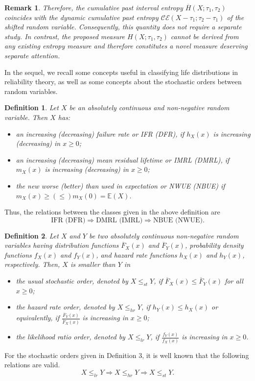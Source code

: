\documentclass[11pt]{article}
\newtheorem{remark}{Remark}
\newtheorem{definition}{Definition}
\begin{document}
\begin{remark}
	Therefore, the cumulative past interval entropy $\overline{H}(X;\tau_1,\tau_2)$ coincides with the dynamic cumulative past entropy $\mathscr{CE}(X - \tau_1; \tau_2 - \tau_1)$ of the shifted random variable. Consequently, this quantity does not require a separate study. In contrast, the proposed measure $ H(X; \tau_1, \tau_2) $ cannot be derived from any existing entropy measure and therefore constitutes a novel measure deserving separate attention.
\end{remark}

In the sequel, we recall some concepts useful in classifying life distributions in reliability theory, as well as some concepts about the stochastic orders between random variables.

\begin{definition}
	Let $X$ be an absolutely continuous and non-negative random variable. Then $X$ has:
	\begin{itemize}
		\item[(i)] an increasing (decreasing) failure rate or IFR (DFR), if $h_X (x)$ is increasing (decreasing) in $x \geq 0$;
		\item[(ii)] an increasing (decreasing) mean residual lifetime or IMRL (DMRL), if $m_X (x)$ is increasing (decreasing) in $x \geq 0$;
		\item[(iii)] the new worse (better) than used in expectation or NWUE (NBUE) if $m_X (x) \geq (\leq) m_X (0)=\mathbb{E}(X)$.
	\end{itemize}
\end{definition}

Thus, the relations between the classes given in the above definition are
\[ \text{IFR (DFR)} \Rightarrow \text{DMRL (IMRL)} \Rightarrow \text{NBUE (NWUE)}. \]

\begin{definition}
	Let $X$ and $Y$ be two absolutely continuous non-negative random variables having distribution functions $\overline{F}_X (x)$ and $\overline{F}_Y (x)$, probability density functions $f_X (x)$ and $f_Y (x)$, and hazard rate functions $h_X (x)$ and $h_Y (x)$, respectively. Then, $X$ is smaller than $Y$ in
	\begin{itemize}
		\item[(i)] the usual stochastic order, denoted by $X \leq_{st} Y$, if $ \overline{F}_X (x) \leq \overline{F}_Y (x)$ for all $x \geq 0$;
		\item[(ii)] the hazard rate order, denoted by $X \leq_{hr} Y$, if $h_Y (x) \leq h_X (x)$ or equivalently, if $\frac{\overline{F}_Y (x)}{\overline{F}_X (x)}$ is increasing in $x \geq 0$;
		\item[(iii)] the likelihood ratio order, denoted by $X \leq_{lr} Y$, if $\textstyle \frac{f_Y (x)}{f_X (x)}$ is increasing in $x \geq 0$.
	\end{itemize}
\end{definition}
For the stochastic orders given in Definition 3, it is well known that the following relations are valid.
\[ \textstyle X \leq_{lr} Y \Rightarrow X \leq_{hr} Y \Rightarrow X \leq_{st} Y. \]
\end{document}
